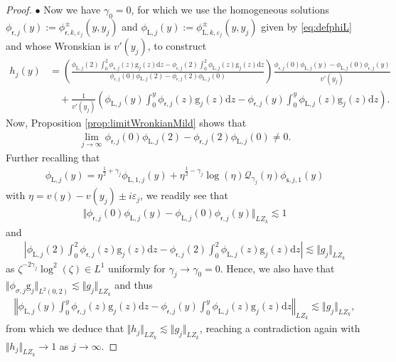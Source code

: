 \documentclass[11pt,reqno]{amsproc}
\newcommand{\bullpar}[1]{\vspace{.5em}\noindent $\bullet$ \normalfont {\bfseries #1.}}
\theoremstyle{definition}
\numberwithin{equation}{section}
\newcommand{\rL}{{\mathrm{L}}}
\newcommand{\cJ}{{\mathcal{J}}}
\newcommand{\Q}{{\mathcal{Q}}}
\newcommand{\sr}{{\mathsf{r}}}
\newcommand{\s}{{\mathsf{s}}}
\renewcommand{\d}{\mathrm{d}}
\newcommand{\ep}{\varepsilon}
\begin{document}
\begin{proof}
\bullpar{Case $\cJ(y_0)=\frac14$} Now we have $\gamma_0=0$, for which we use the homogeneous solutions $\phi_{\sr,j}(y):=\phi_{\sr,k,\ep_j}^\pm(y,y_j)$ and $\phi_{\rL,j}(y):=\phi_{\rL,k,\ep_j}^\pm(y,y_j)$ given by \eqref{eq:defphiL} and whose Wronskian is $v'(y_j)$, to construct 
\begin{align*}
h_j(y)&= \left( \frac{\phi_{\rL,j}(2)\int_0^2 \phi_{\sr,j}(z) \mathrm{g}_j(z) \d z - \phi_{\sr,j}(2)\int_0^2 \phi_{\rL,j}(z) \mathrm{g}_j(z)\d z }{\phi_{\sr,j}(0)\phi_{\rL,j}(2) - \phi_{\sr,j}(2)\phi_{\rL,j}(0)} \right)  \frac{\phi_{\sr,j}(0)\phi_{\rL,j}(y) - \phi_{\rL,j}(0)\phi_{\sr,j}(y)}{v'(y_j)} \\
&\quad +  \frac{1}{v'(y_j)}\left( \phi_{\rL,j}(y) \int_0^y \phi_{\sr,j}(z)\mathrm{g}_j(z) \d z - \phi_{\sr,j}(y) \int_0^y \phi_{\rL,j}(z)\mathrm{g}_j(z) \d z \right).
\end{align*}
Now, Proposition \ref{prop:limitWronkianMild} shows that
\begin{align*}
\lim_{j\rightarrow\infty} \phi_{\sr,j}(0)\phi_{\rL,j}(2) - \phi_{\sr,j}(2)\phi_{\rL,j}(0) \neq 0.
\end{align*}
Further recalling that 
\begin{align*}
\phi_{\rL,j}(y) = \eta^{\frac12+\gamma_j}\phi_{\rL,1,j}(y) + \eta^{\frac12-\gamma_j}\log(\eta) \Q_{\gamma_j}(\eta) \phi_{\s,j,1}(y)
\end{align*}
with $\eta= v(y) - v(y_j) \pm i\ep_j$, we readily see that
\begin{align*}
\Vert \phi_{\sr,j}(0)\phi_{\rL,j}(y) - \phi_{\rL,j}(0)\phi_{\sr,j}(y) \Vert_{LZ_k}\lesssim 1
\end{align*}
and
\begin{align*}
\left| \phi_{\rL,j}(2)\int_0^2 \phi_{\sr,j}(z) \mathrm{g}_j(z) \d z - \phi_{\sr,j}(2)\int_0^2 \phi_{\rL,j}(z) \mathrm{g}_j(z)\d z \right| \lesssim \Vert g_j \Vert_{LZ_k}
\end{align*}
as $\zeta^{-2\gamma_j}\log^2(\zeta)\in L^1$ uniformly for $\gamma_j\rightarrow \gamma_0=0$. Hence, we also have that $\Vert \phi_{\sigma,j}\mathrm{g}_j \Vert_{L^2(0,2)} \lesssim \Vert g_j \Vert_{LZ_k}$ and thus 
\begin{align*}
\left\Vert \phi_{\rL,j}(y) \int_0^y \phi_{\sr,j}(z)\mathrm{g}_j(z) \d z - \phi_{\sr,j}(y) \int_0^y \phi_{\rL,j}(z)\mathrm{g}_j(z) \d z \right\Vert_{LZ_k} \lesssim \Vert g_j \Vert_{LZ_k},
\end{align*}
from which we deduce that $\Vert h_j \Vert_{LZ_k}\lesssim \Vert g_j \Vert_{LZ_k}$, reaching a contradiction again with $\Vert h_j \Vert_{LZ_k}\rightarrow 1$ as $j\rightarrow \infty$.
\end{proof}
\end{document}
